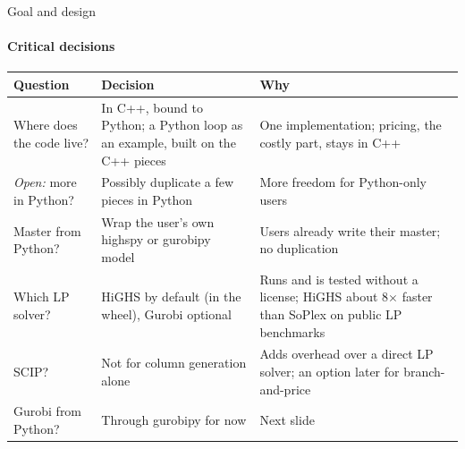 \documentclass[aspectratio=169]{beamer}
\begin{document}
\begin{frame}{Goal and design}
  \framesubtitle{Critical decisions}

  \footnotesize
  \begin{tabular}{p{}p{}p{}}
    \toprule
    \textbf{Question} & \textbf{Decision} & \textbf{Why} \\
    \midrule
    Where does the code live? & In C++, bound to Python; a Python loop as an example, built on the C++ pieces
      & One implementation; pricing, the costly part, stays in C++ \\
    \addlinespace
    \textit{Open:} more in Python? & Possibly duplicate a few pieces in Python
      & More freedom for Python-only users \\
    \addlinespace
    Master from Python? & Wrap the user's own highspy or gurobipy model & Users already write their master; no duplication \\
    \addlinespace
    Which LP solver? & HiGHS by default (in the wheel), Gurobi optional
      & Runs and is tested without a license; HiGHS about 8$\times$ faster than SoPlex on public LP benchmarks \\
    \addlinespace
    SCIP? & Not for column generation alone & Adds overhead over a direct LP solver; an option later for branch-and-price \\
    \addlinespace
    Gurobi from Python? & Through gurobipy for now & Next slide \\
    \bottomrule
  \end{tabular}
\end{frame}
\end{document}
